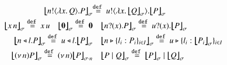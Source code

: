 %
\begin{figure}[t]
\[
\small
\begin{array}{rl}
	\auxmapp{\bout{n}{\abs{x}{Q}} P}{{}}{\sigma} &\!\!\!\!\!\!\defeq
		\bout{u}{\abs{x}{\auxmapp{Q}{{}}{\sigma}}} \auxmapp{P}{{}}{\sigma}
\\[1mm]
	\auxmapp{\appl{x}{n}}{{}}{\sigma}  \defeq
		\appl{x}{u} \quad 
	\auxmapp{\inact}{{}}{\sigma}  \defeq  \inact
 & 
			\auxmapp{\binp{n}{x} P}{{}}{\sigma}\defeq
		\binp{u}{x} \auxmapp{P}{{}}{\sigma} 
\\[1mm]
	\auxmapp{\bsel{n}{l} P}{{}}{\sigma} \defeq
		\bsel{u}{l} \auxmapp{P}{{}}{\sigma} 
 & 
	\auxmapp{\bbra{n}{l_i:P_i}_{i \in I}}{{}}{\sigma}  \defeq 
		\bbra{u}{l_i:\auxmapp{P_i}{{}}{\sigma}}_{i \in I}
	\vspace{1mm} \\
\auxmapp{\news{n} P}{{}}{\sigma}  \defeq  \news{n} \auxmapp{P}{{}}{{\sigma \cat n}}
 & 
	\auxmapp{P \Par Q}{{}}{\sigma}  \defeq  \auxmapp{P}{{}}{\sigma} \Par \auxmapp{Q}{{}}{\sigma} 
\end{array}
\]

\end{figure}
